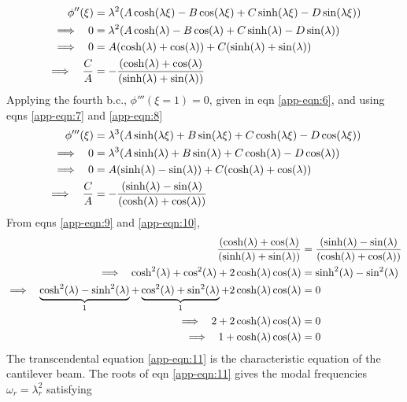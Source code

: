 \documentclass[12pt]{report}
\begin{document}
\begin{align}
  \phi''(\xi) &=  \lambda^2 (A \cosh (\lambda \xi) - B \cos (\lambda \xi) + C\sinh(\lambda \xi) - D\sin(\lambda \xi))  \notag  \\
  \implies~~      0  &= \lambda^2 (A \cosh (\lambda) - B \cos (\lambda) + C\sinh(\lambda) - D\sin(\lambda))\notag \\
   \implies~~   0 &= A (\cosh (\lambda) + \cos (\lambda)) + C(\sinh(\lambda) + \sin(\lambda)) \notag  \\
   \implies ~~ \frac{C}{A} &= - \frac{(\cosh (\lambda) + \cos (\lambda)}{(\sinh(\lambda) + \sin(\lambda))} \label{app-eqn:9}
\end{align}
Applying the fourth b.c., $\phi'''(\xi = 1) = 0$, given in eqn \ref{app-eqn:6}, and using eqns \ref{app-eqn:7} and \ref{app-eqn:8}
\begin{align}
\phi'''(\xi) &=  \lambda^3 (A \sinh (\lambda \xi) + B \sin (\lambda \xi) + C\cosh(\lambda \xi) - D\cos(\lambda \xi))  \notag  \\
\implies~~      0  &= \lambda^3 (A \sinh (\lambda) + B \sin (\lambda) + C\cosh(\lambda) - D\cos(\lambda))\notag \\
\implies~~   0 &= A (\sinh (\lambda) - \sin (\lambda)) + C(\cosh(\lambda) + \cos(\lambda)) \notag  \\
\implies ~~ \frac{C}{A} &= - \frac{(\sinh (\lambda) - \sin (\lambda)}{(\cosh (\lambda) + \cos (\lambda))} \label{app-eqn:10}
\end{align}
From eqns \ref{app-eqn:9} and \ref{app-eqn:10},
\begin{align}
   \frac{(\cosh (\lambda) + \cos (\lambda)}{(\sinh(\lambda) + \sin(\lambda))} &= \frac{(\sinh (\lambda) - \sin (\lambda)}{(\cosh (\lambda) + \cos (\lambda))} \notag \\
   \implies~~ \cosh^2(\lambda) + \cos^2(\lambda) + 2 \cosh(\lambda)\cos(\lambda) &= \sinh^2(\lambda) - \sin^2(\lambda) \notag \\
   \implies~~\underbrace{\cosh^2(\lambda) - \sinh^2(\lambda)}_{1} + \underbrace{\cos^2(\lambda) + \sin^2(\lambda)}_{1} + 2 \cosh(\lambda)\cos(\lambda) &= 0 \notag \\
   \implies~~ 2 + 2 \cosh(\lambda)\cos(\lambda) &= 0  \notag \\
   \implies~~ 1 + \cosh(\lambda)\cos(\lambda) &= 0  \label{app-eqn:11} 
\end{align}
The transcendental equation \ref{app-eqn:11} is the characteristic equation of the cantilever beam. The roots of eqn \ref{app-eqn:11} gives the modal frequencies $\omega_r = \lambda_r^2$ satisfying 
\end{document}
